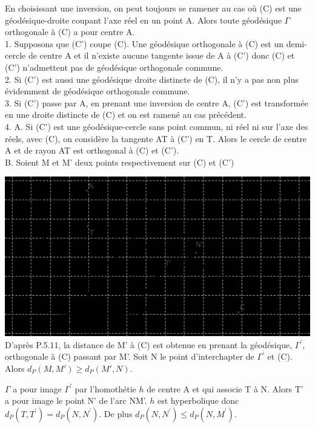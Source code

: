 \documentclass[a4paper, 12pt, twoside]{book}
\begin{document}
 En choisissant une inversion, on peut toujours se ramener au cas où (C) est une géodésique-droite coupant l'axe réel en un point A. Alors toute géodésique  $\Gamma$ orthogonale à (C) a pour centre A.\\
 
 
 1. Supposons que (C') coupe (C). Une géodésique orthogonale à (C) est un demi-cercle de centre A et il n'existe aucune  tangente issue de A à (C') donc (C) et (C') n'admettent pas de géodésique orthogonale commune.\\
 
 2. Si (C') est aussi une géodésique droite distincte de (C), il n'y a pas non plus évidemment de géodésique orthogonale commune.\\
 
 3. Si (C') passe par A, en prenant une inversion de centre A, (C') est transformée en une droite distincte de (C) et on est ramené au cas précédent.\\
 
 4. A. Si (C') est une géodésique-cercle sans point commun, ni réel ni sur l'axe des réels, avec (C), on considère la tangente AT à (C') en T. Alors le cercle de centre A et de rayon AT est orthogonal à (C) et (C').\\
 
 B. Soient M et M' deux points respectivement sur (C) et (C')
 
  \includegraphics[scale=0.9]{figures/isom25.eps}\\
  
  
  D'après P.5.11, la distance de M' à (C) est obtenue en prenant la géodésique, $\Gamma^{'}$, orthogonale à (C) passant par M'. Soit N le point d'interchapter de $\Gamma^{'}$ et (C). Alors $d_{P}(M, M')\geq d_{P}(M', N)$.\
  
  $\Gamma$ a pour image $\Gamma^{'}$ par l'homothétie $h$ de centre A et qui associe T à N. Alors T' a pour image le point N' de l'arc NM'. $h$ est hyperbolique donc $d_{P}(T, T^{'})=d_{P}(N, N^{'})$. De plus $d_{P}(N, N^{'})\leq d_{P}(N, M^{'})$.\
  
\end{document}
